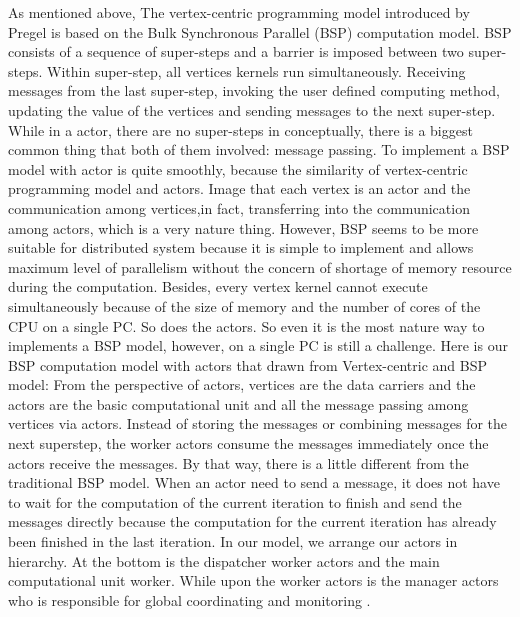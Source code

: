 \documentclass[twocolumn,a4paper,10pt]{article}
\begin{document}
 As mentioned above, The vertex-centric programming model introduced by Pregel is based on the Bulk Synchronous Parallel (BSP) computation model. BSP consists of a sequence of super-steps and a barrier is imposed between two super-steps. Within super-step, all vertices kernels run simultaneously. Receiving messages from the last super-step, invoking the user defined computing method, updating the value of the vertices and sending messages to the next super-step. While in a actor, there are no super-steps in conceptually, there is a biggest common thing that both of them involved: message passing. \newline
To implement a BSP model with actor is quite smoothly, because the similarity of vertex-centric programming model and actors. Image that each vertex is an actor and the communication among vertices,in fact, transferring into the communication among actors, which is a very nature thing. However, BSP seems to be more suitable for distributed system because it is simple to implement and allows maximum level of parallelism without the concern of shortage of memory resource during the computation. Besides, every vertex kernel cannot execute simultaneously because of the size of memory and the number of cores of the CPU on a single PC. So does the actors. So even it is the most nature way to implements a BSP model, however, on a single PC is still a challenge. \newline
Here is our BSP computation model with actors that drawn from Vertex-centric and BSP model: From the perspective of actors, vertices are the data carriers and the actors are the basic computational unit and all the message passing among vertices via actors. Instead of storing the messages or combining messages for the next superstep, the worker actors consume the messages immediately once the actors receive the messages. By that way, there is a little different from the traditional BSP model. When an actor need to send a message, it does not have to wait for the computation of the current iteration to finish and send the messages directly because the computation for the current iteration has already been finished in the last iteration.
In our model, we arrange our actors in hierarchy. At the bottom is the dispatcher worker actors and the main computational unit worker. While upon the worker actors is the manager actors who is responsible for global coordinating and monitoring .\newline
\end{document}
